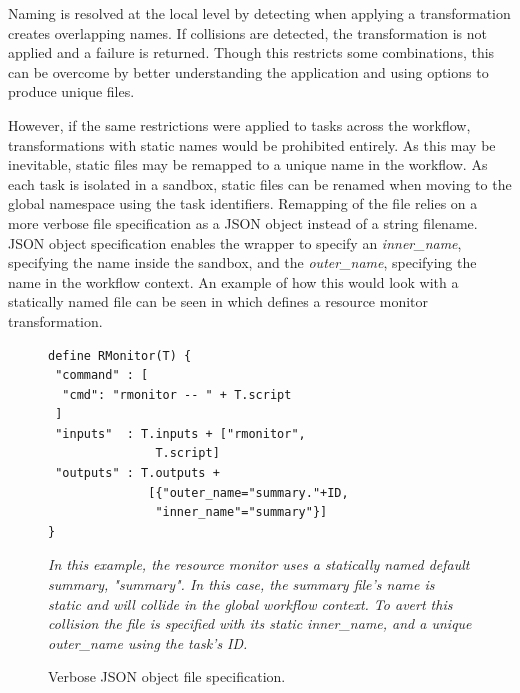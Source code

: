 \documentclass[conference]{IEEEtran}
\begin{document}
Naming is resolved at the local level by detecting
when applying a transformation 
creates overlapping names.
If collisions are detected, the 
transformation is not applied and
a failure is returned.
Though this restricts some combinations, 
this can be overcome by 
better understanding the application
and using options to 
produce unique files.


However, if the same restrictions were
applied to tasks across the workflow,
transformations with static names would
be prohibited entirely.
As this may be inevitable,
static files may be remapped
to a unique name in the workflow.
As each task is isolated in a sandbox, 
static files can be renamed when moving to the 
global namespace using the task identifiers. 
Remapping of the file relies on
a more verbose file specification as
a JSON object instead of a string filename.
JSON object specification enables the wrapper
to specify an \emph{inner\_name}, 
specifying the name inside the sandbox,
and the \emph{outer\_name},
specifying the name in the workflow context. 
An example of how this would look with
a statically named file can be seen in 
 which defines a resource
monitor transformation.

\begin{figure}[h]
\begin{framed}
\small
\begin{verbatim}
define RMonitor(T) {
 "command" : [
  "cmd": "rmonitor -- " + T.script
 ]
 "inputs"  : T.inputs + ["rmonitor",
               T.script]
 "outputs" : T.outputs +
              [{"outer_name="summary."+ID, 
               "inner_name"="summary"}]
}
\end{verbatim}
\end{framed}
 \caption{Verbose JSON object file specification.} 
\small
\emph{In this example, the resource monitor uses
a statically named default summary, "summary".
In this case, the summary 
file's name is static and will collide in
the global workflow context. To avert this
collision the file is specified with its 
static inner\_name, and a unique outer\_name
using the task's ID.}
\label{json-file}
\end{figure}
\end{document}
